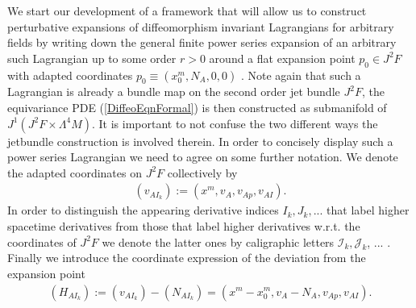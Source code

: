 \documentclass[a4paper,12pt, DIV=14, BCOR=5mm, twoside, headsepline, numbers=noenddot]{scrbook}
\begin{document}
We start our development of a framework that will allow us to construct perturbative expansions of diffeomorphism invariant Lagrangians for arbitrary fields by writing down the general finite power series expansion of an arbitrary such Lagrangian up to some order $r > 0$ around a flat expansion point $p_0 \in J^2F$ with adapted coordinates $p_0 \equiv (x_0^m,N_A, 0, 0)$ . Note again that such a Lagrangian is already a bundle map on the second order jet bundle $J^2F$, the equivariance PDE (\ref{DiffeoEqnFormal}) is then constructed as submanifold of $J^1(J^2F \times \Lambda^4M)$. It is important to not confuse the two different ways the jetbundle construction is involved therein. In order to concisely display such a power series Lagrangian we need to agree on some further notation. We denote the adapted coordinates on $J^2F$ collectively by
\begin{align}
    (v_{AI_k}) := (x^m,v_A,v_{Ap},v_{AI}).
\end{align}
In order to distinguish the appearing derivative indices $I_k,J_k,...$ that label higher spacetime derivatives from those that label higher derivatives w.r.t. the coordinates of $J^2F$ we denote the latter ones by caligraphic letters
$\mathcal{I}_k, \mathcal{J}_k$, ... . Finally we introduce the coordinate expression of the deviation from the expansion point 
\begin{align}
    (H_{AI_k}) := (v_{AI_k}) - (N_{AI_k}) = (x^m-x_0^m,v_A-N_A,v_{Ap},v_{AI}).
\end{align}
\end{document}
